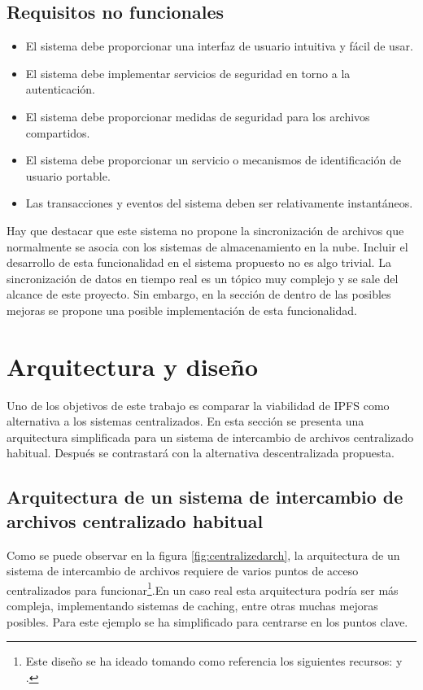 \subsection{Requisitos no funcionales}
\begin{itemize}[noitemsep,after=\vspace{-0.4\baselineskip}]
  \item El sistema debe proporcionar una interfaz de usuario intuitiva y fácil de usar.
  \item El sistema debe implementar servicios de seguridad en torno a la autenticación.
  \item El sistema debe proporcionar medidas de seguridad para los archivos compartidos.
  \item El sistema debe proporcionar un servicio o mecanismos de identificación de usuario portable.
  \item Las transacciones y eventos del sistema deben ser relativamente instantáneos.
\end{itemize}
Hay que destacar que este sistema no propone la sincronización de archivos que normalmente se asocia con los sistemas de
almacenamiento en la nube. Incluir el desarrollo de esta funcionalidad en el sistema propuesto no es algo trivial.
La sincronización de datos en tiempo real es un tópico muy complejo y se sale
del alcance de este proyecto. Sin embargo, en la sección de  dentro de las posibles
mejoras se propone una posible implementación de esta funcionalidad.
\section{Arquitectura y diseño}

Uno de los objetivos de este trabajo es comparar la viabilidad de IPFS como alternativa a los sistemas centralizados.
En esta sección se presenta una arquitectura simplificada para un sistema de intercambio de archivos centralizado habitual.
Después se contrastará con la alternativa descentralizada propuesta.

\subsection{Arquitectura de un sistema de intercambio de archivos centralizado habitual}

Como se puede observar en la figura \ref{fig:centralizedarch}, la arquitectura de un sistema de intercambio de archivos
requiere de varios puntos de acceso centralizados para funcionar\footnote{Este diseño se ha ideado tomando como referencia los siguientes recursos:
  \cite{chakrabortySystemDesignAnalysis2020} y
  \cite{systemdesignSystemDesignInterview2023}.}.En un caso real esta arquitectura podría ser más compleja, implementando sistemas de caching, entre otras muchas mejoras posibles. Para este ejemplo se ha simplificado para centrarse en los puntos clave.

